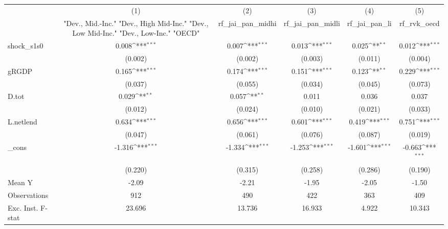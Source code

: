 {
\def\sym#1{\ifmmode^{#1}\else\(^{#1}\)\fi}
\begin{tabular}{l*{5}{c}}
\toprule
            &\multicolumn{1}{c}{(1)}&\multicolumn{1}{c}{(2)}&\multicolumn{1}{c}{(3)}&\multicolumn{1}{c}{(4)}&\multicolumn{1}{c}{(5)}\\
            &\multicolumn{1}{c}{ "Dev., Mid.-Inc." "Dev., High Mid-Inc." "Dev., Low Mid-Inc." "Dev., Low-Inc." "OECD" }&\multicolumn{1}{c}{rf\_jai\_pan\_midhi}&\multicolumn{1}{c}{rf\_jai\_pan\_midli}&\multicolumn{1}{c}{rf\_jai\_pan\_li}&\multicolumn{1}{c}{rf\_rvk\_oecd}\\
\midrule
shock\_s1s0  &       0.008\sym{***}&       0.007\sym{***}&       0.013\sym{***}&       0.025\sym{**} &       0.012\sym{***}\\
            &     (0.002)         &     (0.002)         &     (0.003)         &     (0.011)         &     (0.004)         \\
\addlinespace
gRGDP       &       0.165\sym{***}&       0.174\sym{***}&       0.151\sym{***}&       0.123\sym{**} &       0.229\sym{***}\\
            &     (0.037)         &     (0.055)         &     (0.034)         &     (0.045)         &     (0.073)         \\
\addlinespace
D.tot       &       0.029\sym{**} &       0.057\sym{**} &       0.011         &       0.036         &       0.037         \\
            &     (0.012)         &     (0.024)         &     (0.010)         &     (0.021)         &     (0.033)         \\
\addlinespace
L.netlend   &       0.634\sym{***}&       0.656\sym{***}&       0.601\sym{***}&       0.419\sym{***}&       0.751\sym{***}\\
            &     (0.047)         &     (0.061)         &     (0.076)         &     (0.087)         &     (0.019)         \\
\addlinespace
\_cons      &      -1.316\sym{***}&      -1.334\sym{***}&      -1.253\sym{***}&      -1.601\sym{***}&      -0.663\sym{***}\\
            &     (0.220)         &     (0.315)         &     (0.258)         &     (0.286)         &     (0.190)         \\
\midrule
Mean Y      &       -2.09         &       -2.21         &       -1.95         &       -2.05         &       -1.50         \\
Observations&         912         &         490         &         422         &         363         &         409         \\
Exc. Inst. F-stat&      23.696         &      13.736         &      16.933         &       4.922         &      10.343         \\
\bottomrule
\end{tabular}
}
